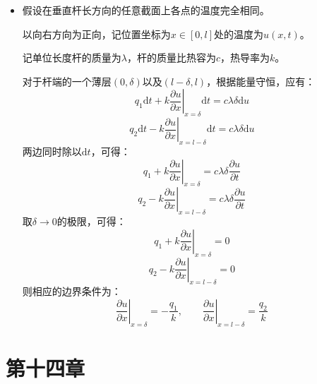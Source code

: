 \documentclass[a4paper,fontset=windows]{ctexart}
\begin{document}
\begin{itemize}
    又因为$t = 0$时受力平衡，初始速度为0，有初始条件：$\left.\dfrac{\partial u}{\partial t}\right|_{t=0} = 0$

    综上，杆的纵振动所满足的方程、边界条件和初始条件为：
    \[
    \frac{\partial^2 u}{\partial t^2} - a^2\frac{\partial^2 u}{\partial x^2} = 0
    \]
    \[
    u(0,t) = 0,\qquad \left.\frac{\partial u}{\partial x}\right|_{x=l} = 0
    \]
    \[
    u(x,0) = \frac{F}{ES}x,\qquad \left.\frac{\partial u}{\partial t}\right|_{t=0} = 0
    \]
    \bigskip

    \item[3.]
    假设在垂直杆长方向的任意截面上各点的温度完全相同。

    以向右方向为正向，记位置坐标为$x \in [0,l]$处的温度为$u(x,t)$。

    记单位长度杆的质量为$\lambda$，杆的质量比热容为$c$，热导率为$k$。

    对于杆端的一个薄层$(0,\delta)$以及$(l-\delta,l)$，根据能量守恒，应有：
    \[
    q_1\mathrm{d}t + \left.k\frac{\partial u}{\partial x}\right|_{x=\delta}\mathrm{d}t = c\lambda\delta\mathrm{d}u
    \]
    \[
    q_2\mathrm{d}t - \left.k\frac{\partial u}{\partial x}\right|_{x=l-\delta}\mathrm{d}t = c\lambda\delta\mathrm{d}u
    \]
    两边同时除以$\mathrm{d}t$，可得：
    \[
    q_1 + \left.k\frac{\partial u}{\partial x}\right|_{x=\delta} = c\lambda\delta\frac{\partial u}{\partial t}
    \]
    \[
    q_2 - \left.k\frac{\partial u}{\partial x}\right|_{x=l-\delta} = c\lambda\delta\frac{\partial u}{\partial t}
    \]
    取$\delta \to 0$的极限，可得：
    \[
    q_1 + \left.k\frac{\partial u}{\partial x}\right|_{x=\delta} = 0
    \]
    \[
    q_2 - \left.k\frac{\partial u}{\partial x}\right|_{x=l-\delta} = 0
    \]
    则相应的边界条件为：
    \[
    \left.\frac{\partial u}{\partial x}\right|_{x=\delta} = -\frac{q_1}{k},\qquad \left.\frac{\partial u}{\partial x}\right|_{x=l-\delta} = \frac{q_2}{k}
    \]

\end{itemize}

\newpage
\section*{第十四章}
\bigskip
\end{document}
